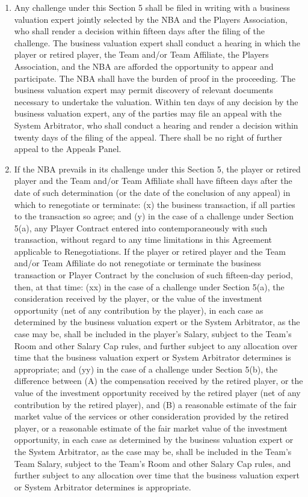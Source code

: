 \documentclass[
]{book}
\providecommand{\tightlist}{%
  \setlength{\itemsep}{0pt}\setlength{\parskip}{0pt}}
\begin{document}
\begin{enumerate}
  \begin{enumerate}
  \def\labelenumii{(\roman{enumii})}
  \tightlist
  \item
    Any challenge under this Section 5 shall be filed in writing with a business valuation expert jointly selected by the NBA and the Players Association, who shall render a decision within fifteen days after the filing of the challenge. The business valuation expert shall conduct a hearing in which the player or retired player, the Team and/or Team Affiliate, the Players Association, and the NBA are afforded the opportunity to appear and participate. The NBA shall have the burden of proof in the proceeding. The business valuation expert may permit discovery of relevant documents necessary to undertake the valuation. Within ten days of any decision by the business valuation expert, any of the parties may file an appeal with the System Arbitrator, who shall conduct a hearing and render a decision within twenty days of the filing of the appeal. There shall be no right of further appeal to the Appeals Panel.
  \item
    If the NBA prevails in its challenge under this Section 5, the player or retired player and the Team and/or Team Affiliate shall have fifteen days after the date of such determination (or the date of the conclusion of any appeal) in which to renegotiate or terminate: (x) the business transaction, if all parties to the transaction so agree; and (y) in the case of a challenge under Section 5(a), any Player Contract entered into contemporaneously with such transaction, without regard to any time limitations in this Agreement applicable to Renegotiations. If the player or retired player and the Team and/or Team Affiliate do not renegotiate or terminate the business transaction or Player Contract by the conclusion of such fifteen-day period, then, at that time: (xx) in the case of a challenge under Section 5(a), the consideration received by the player, or the value of the investment opportunity (net of any contribution by the player), in each case as determined by the business valuation expert or the System Arbitrator, as the case may be, shall be included in the player's Salary, subject to the Team's Room and other Salary Cap rules, and further subject to any allocation over time that the business valuation expert or System Arbitrator determines is appropriate; and (yy) in the case of a challenge under Section 5(b), the difference between (A) the compensation received by the retired player, or the value of the investment opportunity received by the retired player (net of any contribution by the retired player), and (B) a reasonable estimate of the fair market value of the services or other consideration provided by the retired player, or a reasonable estimate of the fair market value of the investment opportunity, in each case as determined by the business valuation expert or the System Arbitrator, as the case may be, shall be included in the Team's Team Salary, subject to the Team's Room and other Salary Cap rules, and further subject to any allocation over time that the business valuation expert or System Arbitrator determines is appropriate.

\end{enumerate}
\end{enumerate}
\end{document}
